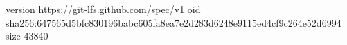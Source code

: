 version https://git-lfs.github.com/spec/v1
oid sha256:647565d5bfc830196babc605fa8ea7e2d283d6248e9115ed4cf9c264e52d6994
size 43840
